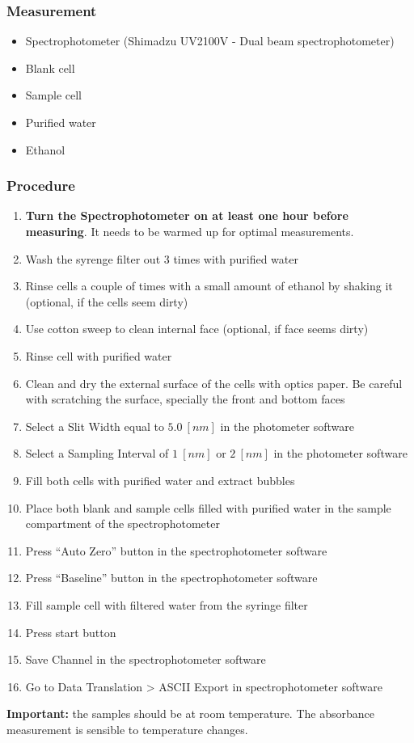 \begin{appendices}
\subsubsection*{Measurement}
\begin{itemize}
  \item Spectrophotometer (Shimadzu UV2100V - Dual beam spectrophotometer)
  \item Blank cell
  \item Sample cell
  \item Purified water
  \item Ethanol
\end{itemize}
\subsubsection{Procedure}
\begin{enumerate}
  \item \textbf{Turn the Spectrophotometer on at least one hour before measuring}. It needs to be warmed up for optimal measurements.
  \item Wash the syrenge filter out 3 times with purified water
  \item Rinse cells a couple of times with a small amount of ethanol by shaking it (optional, if the cells seem dirty)
  \item Use cotton sweep to clean internal face (optional, if face seems dirty)
  \item Rinse cell with purified water
  \item Clean and dry the external surface of the cells with optics paper. Be careful with scratching the surface, specially the front and bottom faces
  \item Select a Slit Width equal to $5.0~[nm]$ in the photometer software
  \item Select a Sampling Interval of $1~[nm]$ or $2~[nm]$ in the photometer software
  \item Fill both cells with purified water and extract bubbles
  \item Place both blank and sample cells filled with purified water in the sample compartment of the spectrophotometer
  \item Press ``Auto Zero'' button in the spectrophotometer software
  \item Press ``Baseline'' button in the spectrophotometer software
  \item Fill sample cell with filtered water from the syringe filter
  \item Press start button
  \item Save Channel in the spectrophotometer software
  \item Go to Data Translation > ASCII Export in spectrophotometer software
\end{enumerate}
\textbf{Important:} the samples should be at room temperature. The absorbance measurement is sensible to temperature changes.

\end{appendices}
